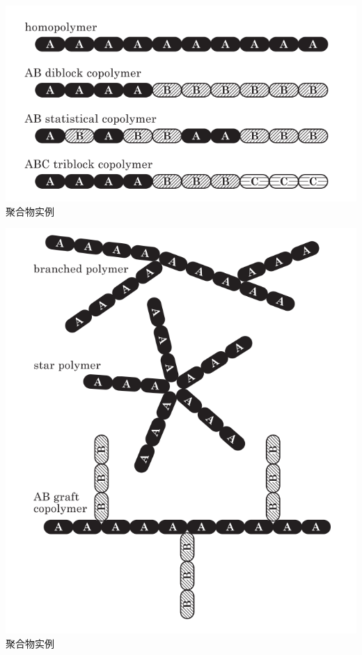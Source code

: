 \begin{center}
	\includegraphics[scale=0.5
	]{./figures/1-1.png}
聚合物实例

	\includegraphics[scale=0.5
	]{./figures/1-2.png}
聚合物实例
\end{center}



